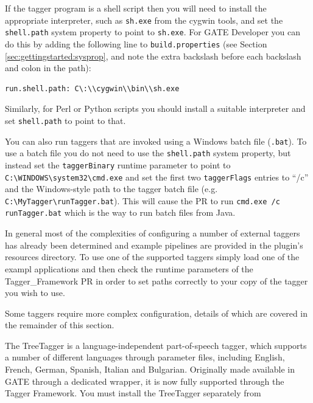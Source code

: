 If the tagger program is a shell script then you will need to install the
appropriate interpreter, such as \texttt{sh.exe} from the cygwin tools, and set
the \texttt{shell.path} system property to point to \texttt{sh.exe}.  For GATE
Developer you can do this by adding the following line to
\texttt{build.properties} (see Section \ref{sec:gettingstarted:sysprop}, and
note the extra backslash before each backslash and colon in the path):

\begin{small}
\begin{verbatim}
run.shell.path: C\:\\cygwin\\bin\\sh.exe
\end{verbatim}
\end{small}

Similarly, for Perl or Python scripts you should install a suitable interpreter
and set \texttt{shell.path} to point to that.

You can also run taggers that are invoked using a Windows batch file
(\texttt{.bat}).  To use a batch file you do not need to use the
\texttt{shell.path} system property, but instead set the \texttt{taggerBinary}
runtime parameter to point to \verb|C:\WINDOWS\system32\cmd.exe| and set the
first two \texttt{taggerFlags} entries to ``/c'' and the Windows-style path to
the tagger batch file (e.g.  \verb|C:\MyTagger\runTagger.bat|).  This will
cause the PR to run \verb|cmd.exe /c runTagger.bat| which is the way to run
batch files from Java.

In general most of the complexities of configuring a number of external taggers has
already been determined and example pipelines are provided in the plugin's resources
directory. To use one of the supported taggers simply load one of the exampl
applications and then check the runtime parameters of the Tagger\_Framework PR
in order to set paths correctly to your copy of the tagger you wish to use.

Some taggers require more complex configuration, details of which are covered in
the remainder of this section.


The TreeTagger is a language-independent part-of-speech tagger, which
supports a number of different languages through parameter files,
including English, French, German, Spanish, Italian and Bulgarian.
Originally made available in GATE through a dedicated wrapper, it is
now fully supported through the Tagger Framework. You must install the
TreeTagger separately from

